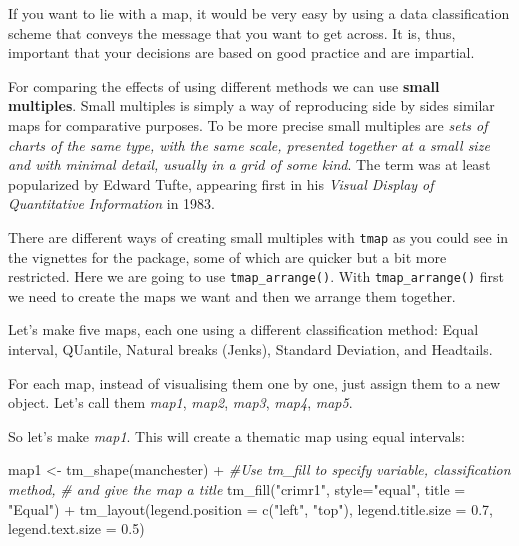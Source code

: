 \documentclass[
  krantz2]{krantz}
\makeatletter
\newenvironment{Shaded}{\begin{snugshade}}{\end{snugshade}}
\newcommand{\AttributeTok}[1]{\textcolor[rgb]{0.61,0.61,0.61}{#1}}
\newcommand{\CommentTok}[1]{\textcolor[rgb]{0.37,0.37,0.37}{\textit{#1}}}
\newcommand{\FloatTok}[1]{\textcolor[rgb]{0.06,0.06,0.06}{#1}}
\newcommand{\FunctionTok}[1]{\textcolor[rgb]{0,0,0}{#1}}
\newcommand{\NormalTok}[1]{#1}
\newcommand{\OtherTok}[1]{\textcolor[rgb]{0.37,0.37,0.37}{#1}}
\newcommand{\SpecialCharTok}[1]{\textcolor[rgb]{0,0,0}{#1}}
\newcommand{\StringTok}[1]{\textcolor[rgb]{0.5,0.5,0.5}{#1}}
\newenvironment{kframe}{%
\medskip{}
\setlength{\fboxsep}{.8em}
 \def\at@end@of@kframe{}%
 \ifinner\ifhmode%
  \def\at@end@of@kframe{\end{minipage}}%
  \begin{minipage}{\columnwidth}%
 \fi\fi%
 \def\FrameCommand##1{\hskip\@totalleftmargin \hskip-\fboxsep
 \colorbox{shadecolor}{##1}\hskip-\fboxsep
     \hskip-\linewidth \hskip-\@totalleftmargin \hskip\columnwidth}%
 \MakeFramed {\advance\hsize-\width
   \@totalleftmargin\z@ \linewidth\hsize
   \@setminipage}}%
 {\par\unskip\endMakeFramed%
 \at@end@of@kframe}
\renewenvironment{Shaded}{\begin{kframe}}{\end{kframe}}
\makeatother
\begin{document}
If you want to lie with a map, it would be very easy by using a data classification scheme that conveys the message that you want to get across. It is, thus, important that your decisions are based on good practice and are impartial.

For comparing the effects of using different methods we can use \textbf{small multiples}. Small multiples is simply a way of reproducing side by sides similar maps for comparative purposes. To be more precise small multiples are \emph{sets of charts of the same type, with the same scale, presented together at a small size and with minimal detail, usually in a grid of some kind}. The term was at least popularized by Edward Tufte, appearing first in his \emph{Visual Display of Quantitative Information} in 1983.

There are different ways of creating small multiples with \texttt{tmap} as you could see in the vignettes for the package, some of which are quicker but a bit more restricted. Here we are going to use \texttt{tmap\_arrange()}. With \texttt{tmap\_arrange()} first we need to create the maps we want and then we arrange them together.

Let's make five maps, each one using a different classification method: Equal interval, QUantile, Natural breaks (Jenks), Standard Deviation, and Headtails.

For each map, instead of visualising them one by one, just assign them to a new object. Let's call them \emph{map1}, \emph{map2}, \emph{map3}, \emph{map4}, \emph{map5}.

So let's make \emph{map1}. This will create a thematic map using equal intervals:

\begin{Shaded}
\begin{Highlighting}[]
\NormalTok{map1 }\OtherTok{\textless{}{-}} \FunctionTok{tm\_shape}\NormalTok{(manchester) }\SpecialCharTok{+}    
  \CommentTok{\#Use tm\_fill to specify variable, classification method, }
  \CommentTok{\# and give the map a title}
  \FunctionTok{tm\_fill}\NormalTok{(}\StringTok{"crimr1"}\NormalTok{, }\AttributeTok{style=}\StringTok{"equal"}\NormalTok{, }\AttributeTok{title =} \StringTok{"Equal"}\NormalTok{) }\SpecialCharTok{+} 
  \FunctionTok{tm\_layout}\NormalTok{(}\AttributeTok{legend.position =} \FunctionTok{c}\NormalTok{(}\StringTok{"left"}\NormalTok{, }\StringTok{"top"}\NormalTok{),   }
            \AttributeTok{legend.title.size =} \FloatTok{0.7}\NormalTok{, }\AttributeTok{legend.text.size =} \FloatTok{0.5}\NormalTok{)}
\end{Highlighting}
\end{Shaded}
\end{document}
